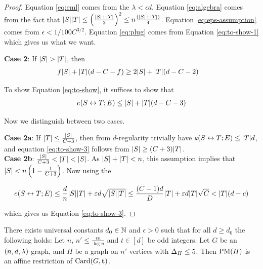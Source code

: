 \documentclass[11pt]{article}
\begin{document}
\begin{proof}
Equation \eqref{eq:eml} comes from the  $\lambda < \epsilon d$.
Equation \eqref{eq:algebra} comes from the fact that $|S||T| \leq \left(\frac{|S|+|T|}{2}\right)^2 \le n\frac{(|S|+|T|)}{4}$.
Equation \eqref{eq:eps-assumption} comes from $\epsilon < 1/100C^{3/2}$.
Equation \eqref{eq:plug} comes from Equation \eqref{eq:to-show-1} which gives us what we want.

\textbf{Case 2}: If $|S| > |T|$, then 
  \begin{align}
    f|S| +  |T|(d-C-f)  &\ge 2|S| +|T|(d-C-2) \label{eq:to-show-2}
  \end{align}
  
  To show Equation \eqref{eq:to-show}, it suffices to show that
\begin{align}
  e(S \leftrightarrow T; E) \leq |S| + |T|(d-C-3) \label{eq:to-show-3}
\end{align}

Now we distinguish between two cases.

\textbf{Case 2a}: If $|T| \le \frac{|S|}{C+3}$, then from $d$-regularity trivially have $e(S \leftrightarrow T; E) \leq |T|d$, and equation \eqref{eq:to-show-3} follows from $|S| \geq (C+3)|T|$. \\

\textbf{Case 2b}: $ \frac{|S|}{C+3} < |T| < |S|$. As $|S| + |T| < n$, this assumption implies that $|S| < n\left(1 - \frac{1}{C+3}\right)$.
Now using the 

\[ e(S \leftrightarrow T; E) \le \frac{d}{n}|S||T| + \varepsilon d \sqrt{|S||T|} \le \frac{(C-1)d}{D}|T| + \varepsilon d |T|\sqrt{C} < |T|(d-c)\]

which gives us Equation \eqref{eq:to-show-3}.

\end{proof}  

\begin{theorem}\label{thm:general-hardness-result}
  There exists universal constants $d_0 \in \mathbb{N}$ and $\epsilon > 0$ such that for all $d \ge d_0$ the following holds: Let $n$, $n' \le \frac{\epsilon n}{\log n}$ and $t \in [d]$ be odd integers.
  Let $G$ be an $(n, d, \lambda)$ graph, and $H$ be a graph on $n'$ vertices with $\Delta_{H} \le 5$.
  Then $\text{PM}(H)$ is an affine restriction of $\text{Card}(G, \mathbf{t})$.
\end{theorem}
\end{document}
